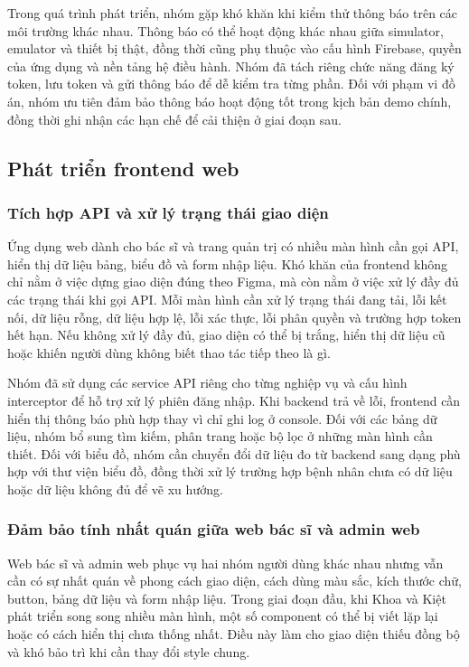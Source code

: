 \par Trong quá trình phát triển, nhóm gặp khó khăn khi kiểm thử thông báo trên các môi trường khác nhau. Thông báo có thể hoạt động khác nhau giữa simulator, emulator và thiết bị thật, đồng thời cũng phụ thuộc vào cấu hình Firebase, quyền của ứng dụng và nền tảng hệ điều hành. Nhóm đã tách riêng chức năng đăng ký token, lưu token và gửi thông báo để dễ kiểm tra từng phần. Đối với phạm vi đồ án, nhóm ưu tiên đảm bảo thông báo hoạt động tốt trong kịch bản demo chính, đồng thời ghi nhận các hạn chế để cải thiện ở giai đoạn sau.

\subsection{Phát triển frontend web}

\subsubsection{Tích hợp API và xử lý trạng thái giao diện}
\par Ứng dụng web dành cho bác sĩ và trang quản trị có nhiều màn hình cần gọi API, hiển thị dữ liệu bảng, biểu đồ và form nhập liệu. Khó khăn của frontend không chỉ nằm ở việc dựng giao diện đúng theo Figma, mà còn nằm ở việc xử lý đầy đủ các trạng thái khi gọi API. Mỗi màn hình cần xử lý trạng thái đang tải, lỗi kết nối, dữ liệu rỗng, dữ liệu hợp lệ, lỗi xác thực, lỗi phân quyền và trường hợp token hết hạn. Nếu không xử lý đầy đủ, giao diện có thể bị trắng, hiển thị dữ liệu cũ hoặc khiến người dùng không biết thao tác tiếp theo là gì.

\par Nhóm đã sử dụng các service API riêng cho từng nghiệp vụ và cấu hình interceptor để hỗ trợ xử lý phiên đăng nhập. Khi backend trả về lỗi, frontend cần hiển thị thông báo phù hợp thay vì chỉ ghi log ở console. Đối với các bảng dữ liệu, nhóm bổ sung tìm kiếm, phân trang hoặc bộ lọc ở những màn hình cần thiết. Đối với biểu đồ, nhóm cần chuyển đổi dữ liệu đo từ backend sang dạng phù hợp với thư viện biểu đồ, đồng thời xử lý trường hợp bệnh nhân chưa có dữ liệu hoặc dữ liệu không đủ để vẽ xu hướng.

\subsubsection{Đảm bảo tính nhất quán giữa web bác sĩ và admin web}
\par Web bác sĩ và admin web phục vụ hai nhóm người dùng khác nhau nhưng vẫn cần có sự nhất quán về phong cách giao diện, cách dùng màu sắc, kích thước chữ, button, bảng dữ liệu và form nhập liệu. Trong giai đoạn đầu, khi Khoa và Kiệt phát triển song song nhiều màn hình, một số component có thể bị viết lặp lại hoặc có cách hiển thị chưa thống nhất. Điều này làm cho giao diện thiếu đồng bộ và khó bảo trì khi cần thay đổi style chung.

